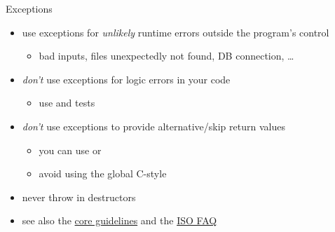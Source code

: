 \begin{frame}[fragile]
  \begin{goodpractice}{Exceptions}
    \begin{itemize}
      \item use exceptions for \textit{unlikely} runtime errors outside the program's control
      \begin{itemize}
        \item bad inputs, files unexpectedly not found, DB connection, \ldots
      \end{itemize}
      \item \textit{don't} use exceptions for logic errors in your code
      \begin{itemize}
        \item use  and tests
      \end{itemize}
      \item \textit{don't} use exceptions to provide alternative/skip return values
      \begin{itemize}
        \item you can use  or 
        \item avoid using the global C-style 
      \end{itemize}
      \item never throw in destructors
      \item see also the \href{https://isocpp.github.io/CppCoreGuidelines/CppCoreGuidelines#S-errors}{\cpp core guidelines} and the \href{https://isocpp.org/wiki/faq/exceptions}{ISO \cpp FAQ}
    \end{itemize}
  \end{goodpractice}
\end{frame}

